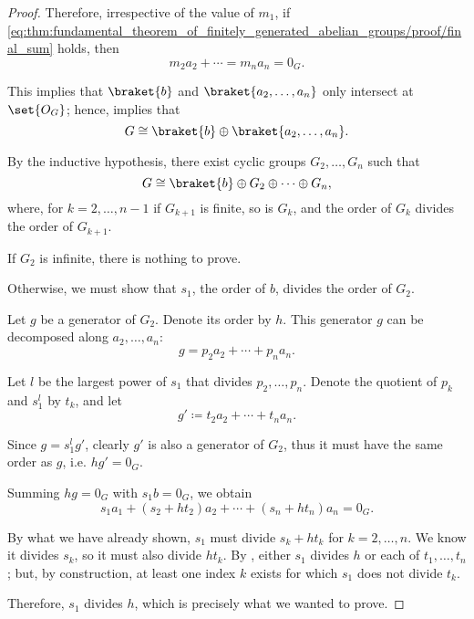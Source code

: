 \begin{proof}
  Therefore, irrespective of the value of \( m_1 \), if \eqref{eq:thm:fundamental_theorem_of_finitely_generated_abelian_groups/proof/final_sum} holds, then
  \begin{equation*}
    m_2 a_2 + \cdots = m_n a_n = 0_G.
  \end{equation*}

  This implies that \( \braket{ b } \) and \( \braket{ a_2, \ldots, a_n } \) only intersect at \( \set{ O_G } \); hence,  implies that
  \begin{equation*}
    G \cong \braket{ b } \oplus \braket{ a_2, \ldots, a_n }.
  \end{equation*}

  By the inductive hypothesis, there exist cyclic groups \( G_2, \ldots, G_n \) such that
  \begin{equation*}
    G \cong \braket{ b } \oplus G_2 \oplus \cdots \oplus G_n,
  \end{equation*}
  where, for \( k = 2, \ldots, n - 1 \) if \( G_{k+1} \) is finite, so is \( G_k \), and the order of \( G_k \) divides the order of \( G_{k+1} \).

   If \( G_2 \) is infinite, there is nothing to prove.

  Otherwise, we must show that \( s_1 \), the order of \( b \), divides the order of \( G_2 \).

  Let \( g \) be a generator of \( G_2 \). Denote its order by \( h \). This generator \( g \) can be decomposed along \( a_2, \ldots, a_n \):
  \begin{equation*}
    g = p_2 a_2 + \cdots + p_n a_n.
  \end{equation*}

  Let \( l \) be the largest power of \( s_1 \) that divides \( p_2, \ldots, p_n \). Denote the quotient of \( p_k \) and \( s_1^l \) by \( t_k \), and let
  \begin{equation*}
    g' \coloneqq t_2 a_2 + \cdots + t_n a_n.
  \end{equation*}

  Since \( g = s_1^l g' \), clearly \( g' \) is also a generator of \( G_2 \), thus it must have the same order as \( g \), i.e. \( h g' = 0_G \).

  Summing \( h g = 0_G \) with \( s_1 b = 0_G \), we obtain
  \begin{equation*}
    s_1 a_1 + (s_2 + h t_2) a_2 + \cdots + (s_n + h t_n) a_n = 0_G.
  \end{equation*}

  By what we have already shown, \( s_1 \) must divide \( s_k + h t_k \) for \( k = 2, \ldots, n \). We know it divides \( s_k \), so it must also divide \( h t_k \). By , either \( s_1 \) divides \( h \) or each of \( t_1, \ldots, t_n \); but, by construction, at least one index \( k \) exists for which \( s_1 \) does not divide \( t_k \).

  Therefore, \( s_1 \) divides \( h \), which is precisely what we wanted to prove.
\end{proof}
